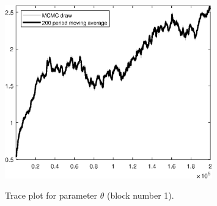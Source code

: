 \begin{figure}[H]
\centering
  \includegraphics[width=0.8\textwidth]{BRS_sectoral_rest/graphs/TracePlot_theta_blck_1}\\
    \caption{Trace plot for parameter ${\theta}$ (block number 1).}
\end{figure}
